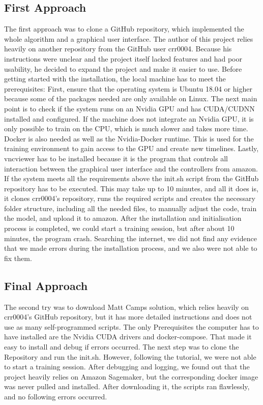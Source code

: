 \subsection{First Approach}
The first approach was to clone a GitHub repository, which implemented the whole algorithm and a graphical user interface. The author of this project relies heavily on another repository from the GitHub user crr0004. Because his instructions were unclear and the project itself lacked features and had poor usability, he decided to expand the project and make it easier to use. 
Before getting started with the installation, the local machine has to meet the prerequisites:
First, ensure that the operating system is Ubuntu 18.04 or higher because some of the packages needed are only available on Linux.
The next main point is to check if the system runs on an Nvidia GPU and has CUDA/CUDNN installed and configured. If the machine does not integrate an Nvidia GPU, it is only possible to train on the CPU, which is much slower and takes more time.
Docker is also needed as well as the Nvidia-Docker runtime. This is used for the training environment to gain access to the GPU and create new timelines.
Lastly, vncviewer has to be installed because it is the program that controls all interaction between the graphical user interface and the controllers from amazon.
If the system meets all the requirements above the init.sh script from the GitHub repository has to be executed.
This may take up to 10 minutes, and all it does is, it clones crr0004's repository, runs the required scripts and creates the necessary folder structure, including all the needed files, to manually adjust the code, train the model, and upload it to amazon.
After the installation and initialisation process is completed, we could start a training session, but after about 10 minutes, the program crash. Searching the internet, we did not find any evidence that we made errors during the installation process, and we also were not able to fix them.

\subsection{Final Approach}
The second try was to download Matt Camps solution, which relies heavily on crr0004's GitHub repository, but it has more detailed instructions and does not use as many self-programmed scripts. The only Prerequisites the computer has to have installed are the Nvidia CUDA drivers and docker-compose. That made it easy to install and debug if errors occurred. The next step was to clone the Repository and run the init.sh. However, following the tutorial, we were not able to start a training session. After debugging and logging, we found out that the project heavily relies on Amazon Sagemaker, but the corresponding docker image was never pulled and installed. After downloading it, the scripts ran flawlessly, and no following errors occurred.

